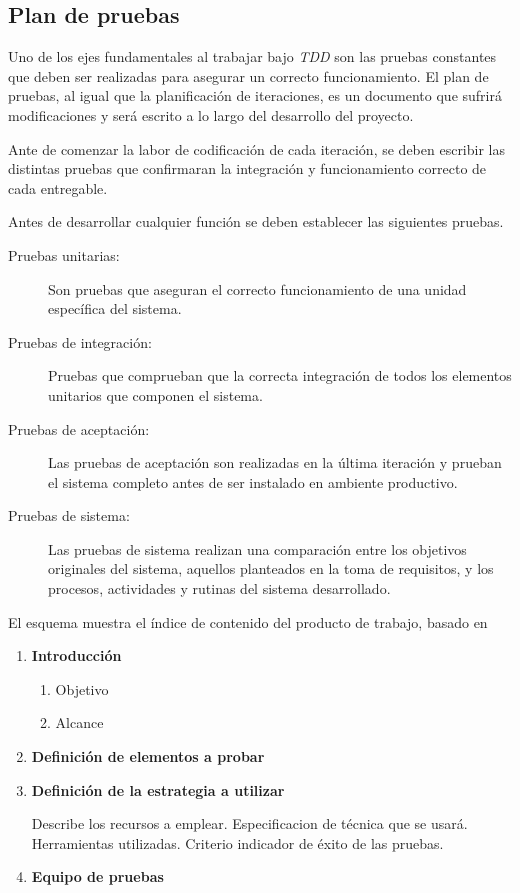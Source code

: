\subsection{Plan de pruebas}

Uno de los ejes fundamentales al trabajar bajo \emph{TDD} son las pruebas constantes que deben ser realizadas para asegurar un correcto funcionamiento. El plan de pruebas, al igual que la planificación de iteraciones, es un documento que sufrirá modificaciones y será escrito a lo largo del desarrollo del proyecto.

Ante de comenzar la labor de codificación de cada iteración, se deben escribir las distintas pruebas que confirmaran la integración y funcionamiento correcto de cada entregable. 

Antes de desarrollar cualquier función se deben establecer las siguientes pruebas. 

\begin{description}
	\item[Pruebas unitarias:]\hfill

	Son pruebas que aseguran el correcto funcionamiento de una unidad específica del sistema. 

	\item[Pruebas de integración:]\hfill

	Pruebas que comprueban que la correcta integración de todos los elementos unitarios que componen el sistema.

	\item[Pruebas de aceptación:]\hfill

	Las pruebas de aceptación son realizadas en la última iteración y prueban el sistema completo antes de ser instalado en ambiente productivo.

	\item[Pruebas de sistema:]\hfill

	Las pruebas de sistema realizan una comparación entre los objetivos originales del sistema, aquellos planteados en la toma de requisitos, y los procesos, actividades y rutinas del sistema desarrollado.
\end{description}

El esquema muestra el índice de contenido del producto de trabajo, basado en \citep{mem00}

\begin{framed}
     \begin{enumerate}
		\item \textbf{Introducción}
		\begin{enumerate}
			\item Objetivo
			\item Alcance 
		\end{enumerate}
		\item \textbf{Definición de elementos a probar}	
		\item \textbf{Definición de la estrategia a utilizar}

		Describe los recursos a emplear. Especificacion de técnica que se usará. Herramientas utilizadas. Criterio indicador de éxito de las pruebas.
		\item \textbf{Equipo de pruebas}
	\end{enumerate}
\end{framed}

